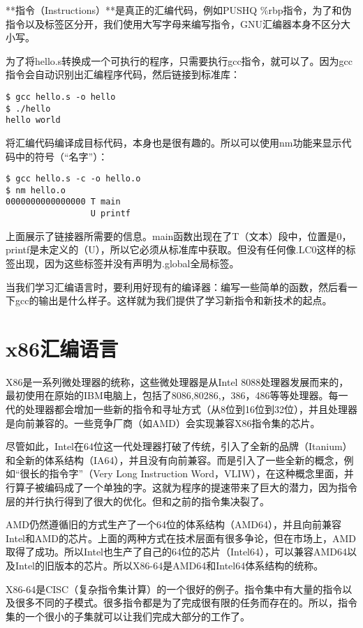 \documentclass[cn,11pt,chinese]{elegantbook}
\begin{document}
**指令（Instructions）**是真正的汇编代码，例如PUSHQ \%rbp指令，为了和伪指令以及标签区分开，我们使用大写字母来编写指令，GNU汇编器本身不区分大小写。

为了将hello.s转换成一个可执行的程序，只需要执行gcc指令，就可以了。因为gcc指令会自动识别出汇编程序代码，然后链接到标准库：

\begin{verbatim}
$ gcc hello.s -o hello
$ ./hello
hello world
\end{verbatim}

将汇编代码编译成目标代码，本身也是很有趣的。所以可以使用nm功能来显示代码中的符号（“名字”）：

\begin{verbatim}
$ gcc hello.s -c -o hello.o
$ nm hello.o
0000000000000000 T main
                 U printf
\end{verbatim}

上面展示了链接器所需要的信息。main函数出现在了T（文本）段中，位置是0，printf是未定义的（U），所以它必须从标准库中获取。但没有任何像.LC0这样的标签出现，因为这些标签并没有声明为.global全局标签。

当我们学习汇编语言时，要利用好现有的编译器：编写一些简单的函数，然后看一下gcc的输出是什么样子。这样就为我们提供了学习新指令和新技术的起点。

\section{x86汇编语言}

X86是一系列微处理器的统称，这些微处理器是从Intel 8088处理器发展而来的，最初使用在原始的IBM电脑上，包括了8086,80286,，386，486等等处理器。每一代的处理器都会增加一些新的指令和寻址方式（从8位到16位到32位），并且处理器是向前兼容的。一些竞争厂商（如AMD）会实现兼容X86指令集的芯片。

尽管如此，Intel在64位这一代处理器打破了传统，引入了全新的品牌（Itanium）和全新的体系结构（IA64），并且没有向前兼容。而是引入了一些全新的概念，例如“很长的指令字”（Very Long Instruction Word，VLIW），在这种概念里面，并行算子被编码成了一个单独的字。这就为程序的提速带来了巨大的潜力，因为指令层的并行执行得到了很大的优化。但和之前的指令集决裂了。

AMD仍然遵循旧的方式生产了一个64位的体系结构（AMD64），并且向前兼容Intel和AMD的芯片。上面的两种方式在技术层面有很多争论，但在市场上，AMD取得了成功。所以Intel也生产了自己的64位的芯片（Intel64），可以兼容AMD64以及Intel的旧版本的芯片。所以X86-64是AMD64和Intel64体系结构的统称。

X86-64是CISC（复杂指令集计算）的一个很好的例子。指令集中有大量的指令以及很多不同的子模式。很多指令都是为了完成很有限的任务而存在的。所以，指令集的一个很小的子集就可以让我们完成大部分的工作了。
\end{document}
